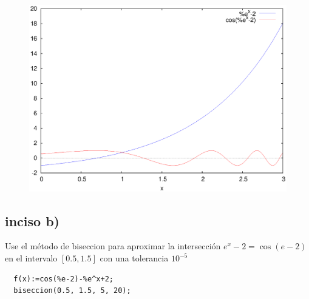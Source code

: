 \begin{figure}[H]
  \centering
  \includegraphics[scale=0.45]{img/maxout_3.eps}
\end{figure}


\subsection{inciso b)}
Use el método de biseccion para aproximar la intersección
$e^x-2=\cos\left(e-2\right)$ en el intervalo $[0.5, 1.5]$ con una
tolerancia $10^{-5}$

\begin{verbatim}
  f(x):=cos(%e-2)-%e^x+2;
  biseccion(0.5, 1.5, 5, 20);
\end{verbatim}


